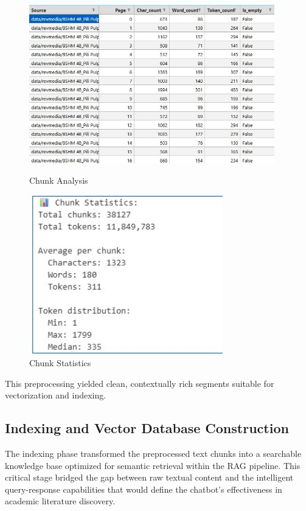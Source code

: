 \begin{refsection}
\begin{figure}[h]
    \centering
    \begin{minipage}{0.48\textwidth}
        \centering
        \includegraphics[width=0.95\textwidth]{figures/chunk_analysis.jpg}
        \caption{Chunk Analysis}
    \end{minipage}\hfill
    \begin{minipage}{0.48\textwidth}
        \centering
        \includegraphics[width=0.75\textwidth]{figures/chunk_stat.jpg}
        \caption{Chunk Statistics}
    \end{minipage}
\end{figure}

This preprocessing yielded clean, contextually rich segments suitable for vectorization and indexing.    

\subsection{Indexing and Vector Database Construction}
The indexing phase transformed the preprocessed text chunks into a searchable knowledge base optimized for semantic retrieval within the RAG pipeline. This critical stage bridged the gap between raw textual content and the intelligent query-response capabilities that would define the chatbot's effectiveness in academic literature discovery.


\end{refsection}
